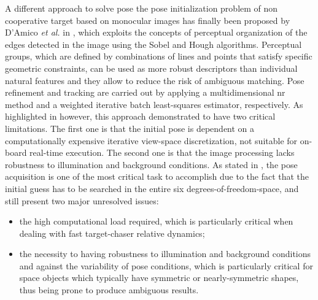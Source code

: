 A different approach to solve pose the pose initialization problem of non cooperative target based on monocular images has finally been proposed by D'Amico \textit{et al.} in \cite{D2014}, which exploits the concepts of perceptual organization \cite{Lowe1987} of the edges detected in the image using the Sobel and Hough algorithms. Perceptual groups, which are defined by combinations of lines and points that satisfy specific geometric constraints, can be used as more robust descriptors than individual natural features and they allow  to reduce the risk of ambiguous matching. Pose refinement and tracking are carried out by applying a multidimensional \acrfull{nr} method and a weighted iterative batch least-squares estimator, respectively. As highlighted in \cite{2019phdSharma} however, this approach demonstrated to have two critical limitations. The first one is that the initial pose is dependent on a computationally expensive iterative view-space discretization, not suitable for on-board real-time execution. The second one is that the image processing lacks robustness to illumination and background conditions.
As stated in \cite{Opromolla2017}, the pose acquisition is one of the most critical task to accomplish due to the fact that the initial guess has to be searched in the entire six degrees-of-freedom-space, and still present two major unresolved issues:

\begin{itemize}
  \item the high computational load required, which is particularly critical when dealing with fast target-chaser relative dynamics;
  \item the necessity to having robustness to illumination and background conditions and against the variability of pose conditions, which is particularly critical for space objects which typically have symmetric or nearly-symmetric shapes, thus being prone to produce ambiguous results.
\end{itemize}